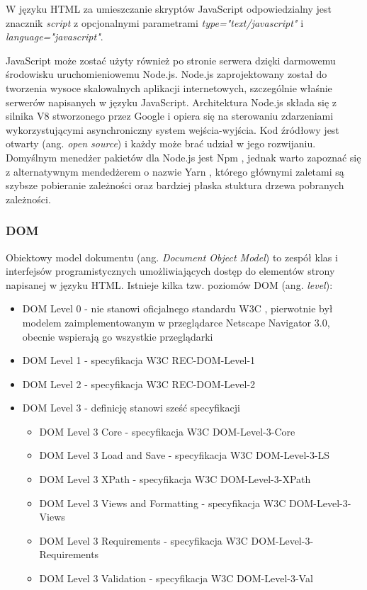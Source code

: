 \documentclass[polish, twoside, 12pt]{mwart}
\begin{document}
W języku HTML za umieszczanie skryptów JavaScript odpowiedzialny jest znacznik \emph{script} z opcjonalnymi parametrami \emph{type="text/javascript"} i \emph{language="javascript"}.

JavaScript może zostać użyty również po stronie serwera dzięki darmowemu środowisku uruchomieniowemu Node.js\cite{node.js}. Node.js zaprojektowany został do tworzenia wysoce skalowalnych aplikacji internetowych, szczególnie właśnie serwerów napisanych w języku JavaScript. Architektura Node.js składa się z silnika V8 \cite{v8} stworzonego przez Google i opiera się na sterowaniu zdarzeniami wykorzystującymi asynchroniczny system wejścia-wyjścia. Kod źródłowy jest otwarty (ang. \emph{open source}) i każdy może brać udział w jego rozwijaniu. Domyślnym menedżer pakietów dla Node.js jest Npm \cite{npm}, jednak warto zapoznać się z alternatywnym mendedżerem o nazwie Yarn \cite{yarn}, którego głównymi zaletami są szybsze pobieranie zależności oraz bardziej płaska stuktura drzewa pobranych zależności.

\subsubsection{DOM}

Obiektowy model dokumentu (ang. \emph{Document Object Model}) to zespół klas i interfejsów programistycznych umożliwiających dostęp do elementów strony napisanej w języku HTML. Istnieje kilka tzw. poziomów DOM (ang. \emph{level}):

\begin{itemize}
  \item DOM Level 0 - nie stanowi oficjalnego standardu W3C \cite{w3c}, pierwotnie był modelem zaimplementowanym w przeglądarce Netscape Navigator 3.0, obecnie wspierają go wszystkie przeglądarki
  \item DOM Level 1 - specyfikacja W3C REC-DOM-Level-1 \cite{w3c-rec-dom-level-1} 
  \item DOM Level 2 - specyfikacja W3C REC-DOM-Level-2 \cite{w3c-rec-dom-level-2} 
  \item DOM Level 3 - definicję stanowi sześć specyfikacji
  \begin{itemize}
    \item DOM Level 3 Core - specyfikacja W3C DOM-Level-3-Core \cite{w3c-rec-dom-level-3-core}
    \item DOM Level 3 Load and Save - specyfikacja W3C DOM-Level-3-LS \cite{w3c-rec-dom-level-3-ls}
    \item DOM Level 3 XPath - specyfikacja W3C DOM-Level-3-XPath \cite{w3c-rec-dom-level-3-xpath}
    \item DOM Level 3 Views and Formatting - specyfikacja W3C DOM-Level-3-Views \cite{w3c-rec-dom-level-3-views}
    \item DOM Level 3 Requirements - specyfikacja W3C DOM-Level-3-Requirements \cite{w3c-rec-dom-level-3-requirements}
    \item DOM Level 3 Validation - specyfikacja W3C DOM-Level-3-Val \cite{w3c-rec-dom-level-3-val}
  \end{itemize}
\end{itemize}
\end{document}
